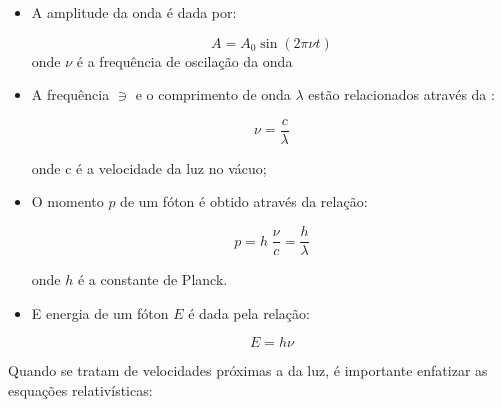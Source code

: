 \documentclass[11pt,a4paper]{article}
\begin{document}
	\begin{itemize}
		\item A amplitude da onda é dada por:
		
			\begin{equation}
				A = A_0 \sin (2 \pi \nu t)
			\end{equation}
			\noindent onde $\nu$ é a frequência de oscilação da onda
		
		\item A frequência $\ni$ e o comprimento de onda $\lambda$ estão relacionados através da :
			
			\begin{equation}
				\nu = \frac{c}{\lambda}
			\end{equation}

			\noindent onde c é a velocidade da luz no vácuo;

		\item O momento $p$ de um fóton é obtido através da relação:
		
			\begin{equation}
				p = h \; \frac{\nu}{c} = \frac{h}{\lambda}
			\end{equation}

			\noindent onde $h$ é a constante de Planck.

		\item E energia de um fóton $E$ é dada pela relação:
		
			\begin{equation}
				E = h \nu
			\end{equation}
	\end{itemize}        

	Quando se tratam de velocidades próximas a da luz, é importante enfatizar as esquações relativísticas:
\end{document}
